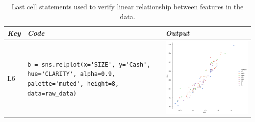 \documentclass[smallextended]{svjour3}       %
\begin{document}
\begin{table}
	\centering
	\caption{Last cell statements used to verify linear relationship between features in the data.}
	\begin{tabular}{@{}m{} m{} m{}@{}}
		\toprule
		\emph{\textbf{Key}}                                                                                                   &
		\emph{\textbf{Code}}                                                                                                  &
		\emph{\textbf{Output}}                                                                                                  \\
		\midrule

		L6                                                                                                                    &
		\lstinline[]$b = sns.relplot(x='SIZE', y='Cash', hue='CLARITY', alpha=0.9, palette='muted', height=8, data=raw_data)$ &
		\includegraphics[width=\linewidth]{linear-relation-check-lineplot.png}                                                  \\


\end{tabular}
\end{table}
\end{document}
